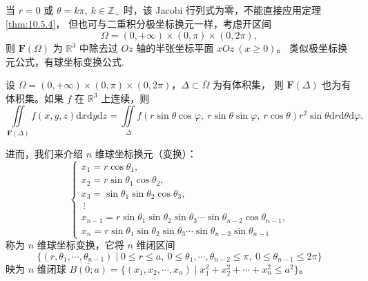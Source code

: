 当 $r = 0$ 或 $\theta = k\pi,\ k \in \mathbb{Z}_+$ 时，该 Jacobi 行列式为零，不能直接应用定理 \ref{thm:10.5.4}，
但也可与二重积分极坐标换元一样，考虑开区间
\[
\Omega = (0, +\infty) \times (0, \pi) \times (0, 2\pi),
\]
则 $\boldsymbol{F}(\Omega)$ 为 $\mathbb{R}^3$ 中除去过 $Oz$ 轴的半张坐标平面 $xOz\ (x \geqslant 0)$。
类似极坐标换元公式，有球坐标变换公式.

\begin{theorem}[三重积分球坐标换元公式]\label{thm:10.5.5}
设 $\Omega = (0, +\infty) \times (0, \pi) \times (0, 2\pi)$，$\Delta \subset \overline{\Omega}$ 为有体积集，
则 $\boldsymbol{F}(\Delta)$ 也为有体积集。如果 $f$ 在 $\mathbb{R}^3$ 上连续，则
\[
\iint \limits_{\boldsymbol{F}(\Delta)} f(x, y, z) \mathrm{d}x \mathrm{d}y \mathrm{d}z
= \iint \limits_{\Delta} f(r \sin\theta \cos\varphi,\ r \sin\theta \sin\varphi,\ r \cos\theta)
  r^2 \sin\theta \mathrm{d}r \mathrm{d}\theta \mathrm{d}\varphi.
\]
\end{theorem}

进而，我们来介绍 $n$ 维球坐标换元（变换）：
\[
\begin{cases}
x_1 = r\cos\theta_1,\\
x_2 = r\sin\theta_1 \cos\theta_2,\\
x_3 = \sin\theta_1 \sin\theta_2 \cos\theta_3,\\
\ \vdots\\
x_{n-1} = r\sin\theta_1 \sin\theta_2 \sin\theta_3 \cdots \sin\theta_{n-2} \cos\theta_{n-1},\\
x_n = r\sin\theta_1 \sin\theta_2 \sin\theta_3 \cdots \sin\theta_{n-2} \sin\theta_{n-1}
\end{cases}
\]
称为 $n$ 维球坐标变换，它将 $n$ 维闭区间
\[
\bigl\{ (r, \theta_1, \cdots, \theta_{n-1}) \mid 0 \leqslant r \leqslant a,\
  0 \leqslant \theta_1, \cdots, \theta_{n-2} \leqslant \pi,\
  0 \leqslant \theta_{n-1} \leqslant 2\pi \bigr\}
\]
映为 $n$ 维闭球
$\overline{B(0; a)} = \{(x_1, x_2, \cdots, x_n) \mid x_1^2 + x_2^2 + \cdots + x_n^2 \leqslant a^2\}$。

